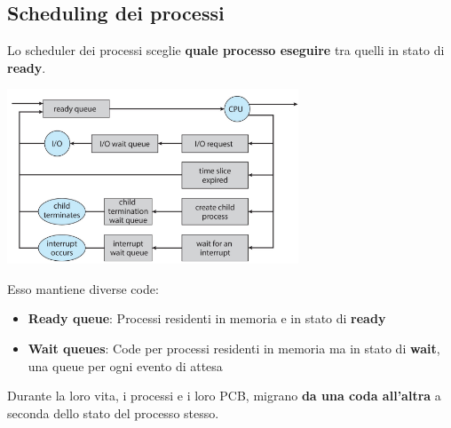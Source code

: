 \documentclass[12pt]{article}
\begin{document}
\subsection{Scheduling dei processi}
Lo scheduler dei processi sceglie \textbf{quale processo eseguire} tra quelli in stato di \textbf{ready}.
\begin{center}
    \includegraphics[width = 0.65\textwidth]{Images/56.PNG}
\end{center}
Esso mantiene diverse code:
\begin{itemize}
    \item \textbf{Ready queue}: Processi residenti in memoria e in stato di \textbf{ready}
    \item \textbf{Wait queues}: Code per processi residenti in memoria ma in stato di \textbf{wait}, una queue per ogni evento di attesa
\end{itemize}
Durante la loro vita, i processi e i loro PCB, migrano \textbf{da una coda all'altra} a seconda dello stato del processo stesso.
\end{document}
